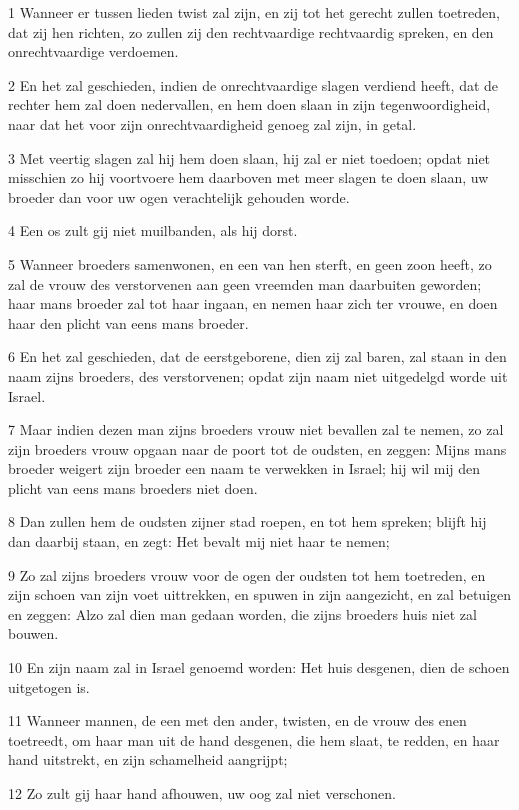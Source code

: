 \par 1 Wanneer er tussen lieden twist zal zijn, en zij tot het gerecht zullen toetreden, dat zij hen richten, zo zullen zij den rechtvaardige rechtvaardig spreken, en den onrechtvaardige verdoemen.
\par 2 En het zal geschieden, indien de onrechtvaardige slagen verdiend heeft, dat de rechter hem zal doen nedervallen, en hem doen slaan in zijn tegenwoordigheid, naar dat het voor zijn onrechtvaardigheid genoeg zal zijn, in getal.
\par 3 Met veertig slagen zal hij hem doen slaan, hij zal er niet toedoen; opdat niet misschien zo hij voortvoere hem daarboven met meer slagen te doen slaan, uw broeder dan voor uw ogen verachtelijk gehouden worde.
\par 4 Een os zult gij niet muilbanden, als hij dorst.
\par 5 Wanneer broeders samenwonen, en een van hen sterft, en geen zoon heeft, zo zal de vrouw des verstorvenen aan geen vreemden man daarbuiten geworden; haar mans broeder zal tot haar ingaan, en nemen haar zich ter vrouwe, en doen haar den plicht van eens mans broeder.
\par 6 En het zal geschieden, dat de eerstgeborene, dien zij zal baren, zal staan in den naam zijns broeders, des verstorvenen; opdat zijn naam niet uitgedelgd worde uit Israel.
\par 7 Maar indien dezen man zijns broeders vrouw niet bevallen zal te nemen, zo zal zijn broeders vrouw opgaan naar de poort tot de oudsten, en zeggen: Mijns mans broeder weigert zijn broeder een naam te verwekken in Israel; hij wil mij den plicht van eens mans broeders niet doen.
\par 8 Dan zullen hem de oudsten zijner stad roepen, en tot hem spreken; blijft hij dan daarbij staan, en zegt: Het bevalt mij niet haar te nemen;
\par 9 Zo zal zijns broeders vrouw voor de ogen der oudsten tot hem toetreden, en zijn schoen van zijn voet uittrekken, en spuwen in zijn aangezicht, en zal betuigen en zeggen: Alzo zal dien man gedaan worden, die zijns broeders huis niet zal bouwen.
\par 10 En zijn naam zal in Israel genoemd worden: Het huis desgenen, dien de schoen uitgetogen is.
\par 11 Wanneer mannen, de een met den ander, twisten, en de vrouw des enen toetreedt, om haar man uit de hand desgenen, die hem slaat, te redden, en haar hand uitstrekt, en zijn schamelheid aangrijpt;
\par 12 Zo zult gij haar hand afhouwen, uw oog zal niet verschonen.
